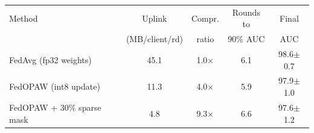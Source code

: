 \begin{tabular}{@{}lcccc@{}}
\toprule
Method & Uplink & Compr. & Rounds to & Final \\
& (MB/client/rd) & ratio & 90\% AUC & AUC \\
\midrule
FedAvg (fp32 weights) & 45.1 & 1.0$\times$ & 6.1 & 98.6$\pm$0.7 \\
FedOPAW (int8 update) & 11.3 & 4.0$\times$ & 5.9 & 97.9$\pm$1.0 \\
FedOPAW + 30\% sparse mask & 4.8 & 9.3$\times$ & 6.6 & 97.6$\pm$1.2 \\
\bottomrule
\end{tabular}
